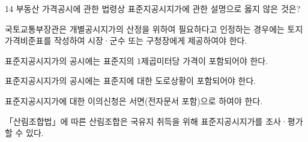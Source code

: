 \begin{question}{14}
부동산 가격공시에 관한 법령상 표준지공시지가에 관한 설명으로 옳지 않은 것은?
\begin{choices}
  \item 국토교통부장관은 개별공시지가의 산정을 위하여 필요하다고 인정하는 경우에는 토지가격비준표를 작성하여 시장·군수 또는 구청장에게 제공하여야 한다.
  \item 표준지공시지가의 공시에는 표준지의 1제곱미터당 가격이 포함되어야 한다.
  \item 표준지공시지가의 공시에는 표준지에 대한 도로상황이 포함되어야 한다.
  \item 표준지공시지가에 대한 이의신청은 서면(전자문서 포함)으로 하여야 한다.
  \item 「산림조합법」에 따른 산림조합은 국유지 취득을 위해 표준지공시지가를 조사·평가할 수 있다.
\end{choices}
\end{question}
